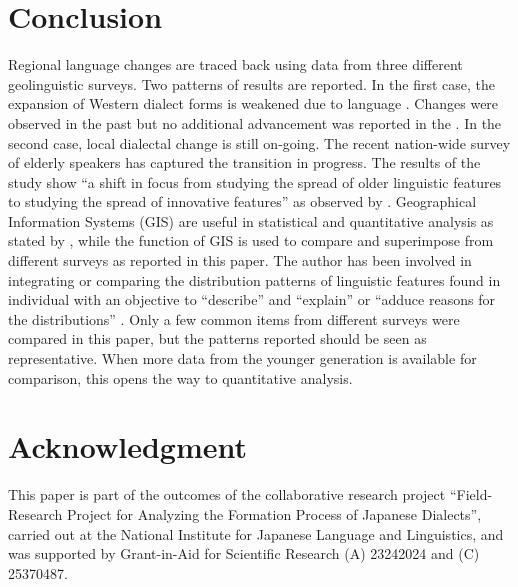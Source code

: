 \documentclass[output=paper]{LSP/langsci}
\begin{document}
\section{Conclusion}

Regional language changes are traced back using data from three different geolinguistic surveys.  Two patterns of results are reported.  In the first case, the expansion of Western dialect forms is weakened due to language .  Changes were observed in the past but no additional advancement was reported in the .  In the second case, local dialectal change is still on-going.  The recent nation-wide survey of elderly speakers has captured the transition in progress.  The results of the study show “a shift in focus from studying the spread of older linguistic features to studying the spread of innovative features” as observed by \citet[412]{gordon_changes_2000}.  Geographical Information Systems (\textsc{GIS}) are useful in statistical and quantitative analysis as stated by \citet{lee_spatial_1993}, while the  function of \textsc{GIS} is used to compare and superimpose  from different surveys as reported in this paper.  The author has been involved in integrating or comparing the distribution patterns of linguistic features found in individual  with an objective to “describe” and “explain” or “adduce reasons for the distributions” \citep[216]{trudgill_linguistic_1974}.  Only a few common items from different surveys were compared in this paper, but the patterns reported should be seen as representative. When more data from the younger generation is available for comparison, this opens the way to quantitative analysis.

\section*{Acknowledgment}

This paper is part of the outcomes of the collaborative research project “Field-Research Project for Analyzing the Formation Process of Japanese Dialects”, carried out at the National Institute for Japanese Language and Linguistics, and was supported by Grant-in-Aid for Scientific Research (A) 23242024 and (C) 25370487.

\printbibliography[heading=subbibliography,notkeyword=this]
\end{document}
